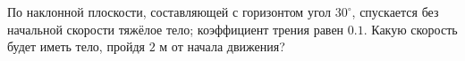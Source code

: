 По наклонной плоскости, составляющей с горизонтом угол $30^\circ$,
спускается без начальной скорости тяжёлое тело; коэффициент трения равен
$0.1$. Какую скорость будет иметь тело, пройдя $2$ м от начала движения?
